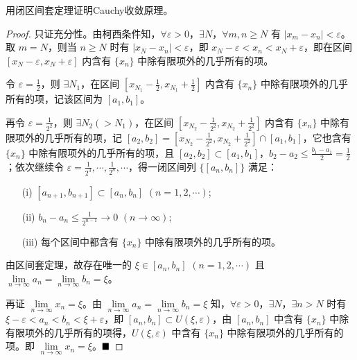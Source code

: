 \begin{problem}
    用闭区间套定理证明Cauchy收敛原理。
\end{problem}

\begin{proof}
        只证充分性。由柯西条件知，$\forall \varepsilon > 0$，$\exists N$，$\forall m, n \geq N$ 有 $|x_m - x_n| < \varepsilon$。取 $m = N$，则当 $n \geq N$ 时有 $|x_N - x_n| < \varepsilon$，即 $x_N - \varepsilon < x_n < x_N + \varepsilon$，即在区间 $[x_N - \varepsilon, x_N + \varepsilon]$ 内含有 $\{x_n\}$ 中除有限项外的几乎所有的项。
        
        令 $\varepsilon = \frac{1}{2}$，则 $\exists N_1$，在区间 $\left[x_{N_1} - \frac{1}{2}, x_{N_1} + \frac{1}{2}\right]$ 内含有 $\{x_n\}$ 中除有限项外的几乎所有的项，记该区间为 $[a_1, b_1]$。
        
        再令 $\varepsilon = \frac{1}{2^2}$，则 $\exists N_2 (> N_1)$，在区间 $\left[x_{N_2} - \frac{1}{2^2}, x_{N_2} + \frac{1}{2^2}\right]$ 内含有 $\{x_n\}$ 中除有限项外的几乎所有的项，记 $[a_2, b_2] = \left[x_{N_2} - \frac{1}{2^2}, x_{N_2} + \frac{1}{2^2}\right] \cap [a_1, b_1]$，它也含有 $\{x_n\}$ 中除有限项外的几乎所有的项，且 $[a_2, b_2] \subset [a_1, b_1]$，$b_2 - a_2 \leq \frac{b_1 - a_1}{2} = \frac{1}{2}$；依次继续令 $\varepsilon = \frac{1}{2^3}, \cdots, \frac{1}{2^n}, \cdots$，得一闭区间列 $\{[a_n, b_n]\}$ 满足：
        
        \begin{enumerate}
            \item[(i)] $[a_{n+1}, b_{n+1}] \subset [a_n, b_n]$ $(n = 1, 2, \cdots)$;
            \item[(ii)] $b_n - a_n \leq \frac{1}{2^{n-1}} \to 0$ $(n \to \infty)$;
            \item[(iii)] 每个区间中都含有 $\{x_n\}$ 中除有限项外的几乎所有的项。
        \end{enumerate}
        
        由区间套定理，故存在唯一的 $\xi \in [a_n, b_n]$ $(n = 1, 2, \cdots)$ 且 $\lim\limits_{n \to \infty} a_n = \lim\limits_{n \to \infty} b_n = \xi$。
        
        再证 $\lim\limits_{n \to \infty} x_n = \xi$。由 $\lim\limits_{n \to \infty} a_n = \lim\limits_{n \to \infty} b_n = \xi$ 知，$\forall \varepsilon > 0$，$\exists N$，$\exists n > N$ 时有 $\xi - \varepsilon < a_n < b_n < \xi + \varepsilon$，即 $[a_n, b_n] \subset U(\xi, \varepsilon)$，由 $[a_n, b_n]$ 中含有 $\{x_n\}$ 中除有限项外的几乎所有的项得，$U(\xi, \varepsilon)$ 中含有 $\{x_n\}$ 中除有限项外的几乎所有的项。即 $\lim\limits_{n \to \infty} x_n = \xi$。$\hfill \blacksquare$
\end{proof}

